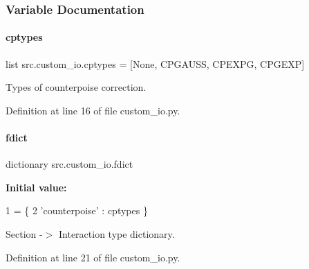 \subsubsection{Variable Documentation}
\mbox{\label{namespacesrc_1_1custom__io_a5700a00b2f3a5bfa169a5f4e3526dc80}} 
\paragraph{\texorpdfstring{cptypes}{cptypes}}
{\footnotesize\ttfamily list src.\+custom\+\_\+io.\+cptypes = \mbox{[}None, \textquotesingle{}C\+P\+G\+A\+U\+SS\textquotesingle{}, \textquotesingle{}C\+P\+E\+X\+PG\textquotesingle{}, \textquotesingle{}C\+P\+G\+E\+XP\textquotesingle{}\mbox{]}}



Types of counterpoise correction. 



Definition at line 16 of file custom\+\_\+io.\+py.

\mbox{\label{namespacesrc_1_1custom__io_af4efc534146ecb0b0d70c73fa4007159}} 
\paragraph{\texorpdfstring{fdict}{fdict}}
{\footnotesize\ttfamily dictionary src.\+custom\+\_\+io.\+fdict}

{\bfseries Initial value\+:}
\begin{DoxyCode}
1 =  \{
2     \textcolor{stringliteral}{'counterpoise'}  : cptypes    \}
\end{DoxyCode}


Section -\/$>$ Interaction type dictionary. 



Definition at line 21 of file custom\+\_\+io.\+py.

\mbox{\label{namespacesrc_1_1custom__io_a5283333b4e623e0fdf572c416dfa2c3e}} 
